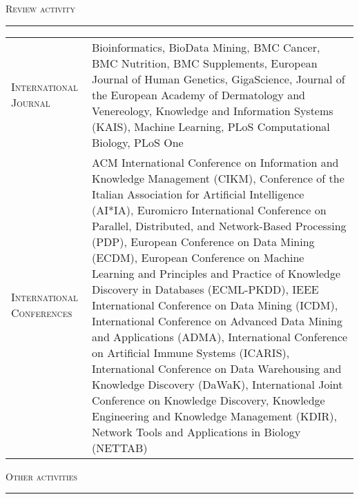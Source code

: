 \documentclass[a4paper,10pt]{article}
\newcommand{\mediumtitle}[1]{
	\vspace{0.2cm}
	{\noindent
	\Large \textsc{#1}\\[-2ex]
	\hrule
	\vspace{0.2cm}}
}
\newenvironment{doubletablelist}
{
	\vspace{-0.2cm}
	\begin{longtable}[!h]{AB}}{\end{longtable}
}
\newcommand{\dtlist}[2]{
\hspace{-3cm}
\noindent
	\begin{minipage}{0.24\textwidth}
	\begin{flushright}
	\textsc{#1}
	\end{flushright}
	\end{minipage}
	& #2\\[0.2cm]
}
\newcommand{\minusitem}{\item[-]}
\begin{document}
\mediumtitle{Review activity}
\begin{doubletablelist}
\dtlist{International Journal}{
		Bioinformatics, BioData Mining, BMC Cancer, BMC Nutrition, BMC Supplements, European Journal of Human Genetics, GigaScience, Journal of the European Academy of Dermatology and Venereology, Knowledge and Information Systems (KAIS), Machine Learning, PLoS Computational Biology, PLoS One
	}
\dtlist{International Conferences}{
	ACM International Conference on Information and Knowledge Management (CIKM), Conference of the Italian Association for Artificial Intelligence (AI*IA), Euromicro International Conference on Parallel, Distributed, and Network-Based Processing (PDP),  European Conference on Data Mining (ECDM),  European Conference on Machine Learning and Principles and Practice of Knowledge Discovery in Databases (ECML-PKDD),  IEEE International Conference on Data Mining (ICDM),  International Conference on Advanced Data Mining and Applications (ADMA),  International Conference on Artificial Immune Systems (ICARIS), International Conference on Data Warehousing and Knowledge Discovery (DaWaK),  International Joint Conference on Knowledge Discovery, Knowledge Engineering and Knowledge Management (KDIR),  Network Tools and Applications in Biology (NETTAB)
}
\end{doubletablelist}

\newpage


\mediumtitle{Other activities}

\end{document}
